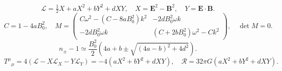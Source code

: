 \[
\mathcal L=\tfrac12 X+aX^2+bY^2+dXY,\quad X=\mathbf E^2-\mathbf B^2,\quad Y=\mathbf E\cdot\mathbf B.
\]
\[
C=1-4aB_0^2,\quad M=\begin{pmatrix}C\omega^2-(C-8aB_0^2)k^2&-2dB_0^2\omega k\\-2dB_0^2\omega k&(C+2bB_0^2)\omega^2-Ck^2\end{pmatrix},\quad\det M=0.
\]
\[
n_\pm-1\simeq\frac{B_0^2}{2}\left(4a+b\pm\sqrt{(4a-b)^2+4d^2}\right).
\]
\[
T^\mu{}_{\mu}=4(\mathcal L-X\mathcal L_X-Y\mathcal L_Y)=-4(aX^2+bY^2+dXY),\quad\mathcal R=32\pi G(aX^2+bY^2+dXY).
\]
